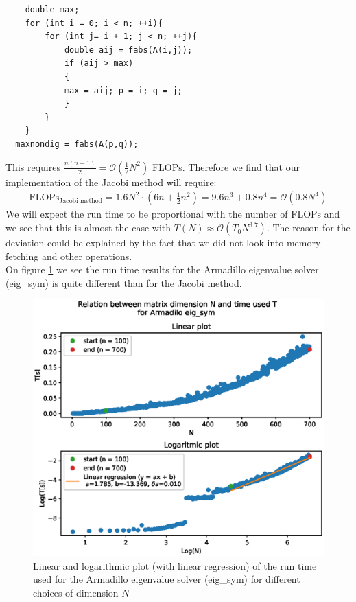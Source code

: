\documentclass[american,a4paper,12pt]{article}
\begin{document}
\begin{verbatim}
    double max;
    for (int i = 0; i < n; ++i){
        for (int j= i + 1; j < n; ++j){
            double aij = fabs(A(i,j));
            if (aij > max)
            {
            max = aij; p = i; q = j;
            }
        }
    }
  maxnondig = fabs(A(p,q));
\end{verbatim}
This requires $\frac{n(n-1)}{2} = \mathcal{O}(\frac{1}{2}N^2)$ FLOPs. Therefore we find that our implementation of the Jacobi method will require:
\begin{align*}
    \text{FLOPs}_{\text{Jacobi method}} = 1.6N^2 \cdot (6n + \frac{1}{2}n^2) = 9.6n^3 + 0.8n^4 = \mathcal{O}(0.8N^{4})
\end{align*}
We will expect the run time to be proportional with the number of FLOPs and we see that this is almost the case with $T(N)  \approx \mathcal{O}(T_0N^{3.7})$. The reason for the deviation could be explained by the fact that we did not look into memory fetching and other operations. \\
On figure \ref{fig:time_dim_armadillo} we see the run time results for the Armadillo eigenvalue solver (eig\_sym) is quite different than for the Jacobi method.
\begin{figure}[H]
    \centering
    \includegraphics[width = \textwidth]{figures/time_dim_armadillo.eps}
    \caption{Linear and logarithmic plot (with linear regression) of the run time used for the Armadillo eigenvalue solver (eig\_sym) for different choices of dimension $N$}
    \label{fig:time_dim_armadillo}
\end{figure}
\end{document}
